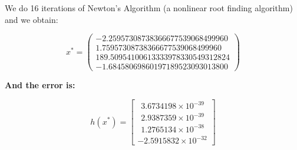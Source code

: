 \documentclass[letterpaper]{article}
\begin{document}
\begin{enumerate}
We do 16 iterations of Newton's Algorithm (a nonlinear root finding algorithm) and we obtain:

$$x^*=\left(\begin{array}{r} -2.25957308738366677539068499960\\ 1.75957308738366677539068499960\\ 189.50954100613333978330549312824\\ -1.68458069860197189523093013800 \end{array}\right)
$$

\noindent \textbf{And the error is:}

$$ h(x^*) = \begin{bmatrix}
 ~ ~3.6734198 \times 10^{-39} \\
   ~ ~2.9387359\times 10^{-39}\\
 ~ ~1.2765134\times 10^{-38}\\
 -2.5915832\times 10^{-32} \end{bmatrix} $$

\end{enumerate}
\end{document}
